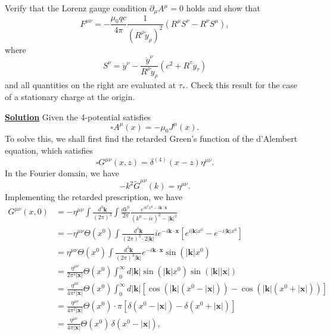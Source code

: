 Verify that the Lorenz gauge condition $\partial_\mu A^\mu = 0$ holds and
show that
\begin{equation}
  F^{\mu\nu} = -\frac{\mu_0 qc}{4\pi}
  \frac{1}{(R^\rho\dot{y}_\rho)^2}
  \left(R^\mu S^\nu - R^\nu S^\mu\right),
\end{equation}
where
\begin{equation}
  S^\nu = \ddot{y}^\nu
  - \frac{\dot{y}^\nu}{R^\rho\dot{y}_\rho}\!\left(c^2 + R^\tau\ddot{y}_\tau\right)
\end{equation}
and all quantities on the right are evaluated at $\tau_*$. Check this result
for the case of a stationary charge at the origin.

\noindent \underline{\textbf{Solution}} Given the 4-potential satisfies
\begin{equation}
    \square A^\mu(x) = -\mu_0J^\mu(x).
\end{equation}
To solve this, we shall first find the retarded Green's function of the d'Alembert equation, which satisfies
\begin{equation}
    \square G^{\mu\nu}(x,z) = \delta^{(4)}(x-z)\eta^{\mu\nu}.
\end{equation}
In the Fourier domain, we have
\begin{equation}
    -k^2\tilde{G}^{\mu\nu}(k) = \eta^{\mu\nu}.
\end{equation}
Implementing the retarded prescription, we have
\begin{align}
    G^{\mu\nu}(x,0) &= -\eta^{\mu\nu}\int\frac{d^3\mathbf{k}}{(2\pi)^3}\int\frac{dk^0}{2\pi}\frac{e^{ik^0x^0-i\mathbf{k}\cdot \mathbf{x}}}{(k^0-i\epsilon)^2-|\mathbf{k}|^2}\\
    &= -\eta^{\mu\nu}\Theta(x^0)\int\frac{d^3\mathbf{k}}{(2\pi)^3\cdot 2|\mathbf{k}|}ie^{-i\mathbf{k}\cdot \mathbf{x}}\left[e^{i|\mathbf{k}|x^0}-e^{-i|\mathbf{k}|x^0}\right]\\
    &=\eta^{\mu\nu}\Theta(x^0)\int\frac{d^3\mathbf{k}}{(2\pi)^3|\mathbf{k}|}e^{-i\mathbf{k}\cdot \mathbf{x}}\sin\left(|\mathbf{k}|x^0\right)\\
    &= \frac{\eta^{\mu\nu}}{2\pi^2|\mathbf{x}|}\Theta(x^0)\int^\infty_0d|\mathbf{k}|\sin\left(|\mathbf{k}|x^0\right)\sin\left(|\mathbf{k}||\mathbf{x}|\right)\\
    &= \frac{\eta^{\mu\nu}}{4\pi^2|\mathbf{x}|}\Theta(x^0) \int^\infty_0d|\mathbf{k}|\left[\cos\!\left(|\mathbf{k}|(x^0 - |\mathbf{x}|)\right) - \cos\!\left(|\mathbf{k}|(x^0 + |\mathbf{x}|)\right)\right]\\
    &= \frac{\eta^{\mu\nu}}{4\pi^2|\mathbf{x}|}\Theta(x^0)\cdot\pi\left[\delta(x^0 - |\mathbf{x}|) - \delta(x^0 + |\mathbf{x}|)\right]\\
    &= \frac{\eta^{\mu\nu}}{4\pi|\mathbf{x}|}\Theta(x^0)\,\delta(x^0 - |\mathbf{x}|),
\end{align}
